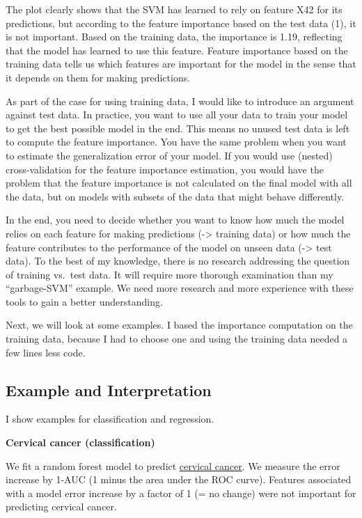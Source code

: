 \documentclass[12pt,]{krantz}
\begin{document}
The plot clearly shows that the SVM has learned to rely on feature X42
for its predictions, but according to the feature importance based on
the test data (1), it is not important. Based on the training data, the
importance is 1.19, reflecting that the model has learned to use this
feature. Feature importance based on the training data tells us which
features are important for the model in the sense that it depends on
them for making predictions.

As part of the case for using training data, I would like to introduce
an argument against test data. In practice, you want to use all your
data to train your model to get the best possible model in the end. This
means no unused test data is left to compute the feature importance. You
have the same problem when you want to estimate the generalization error
of your model. If you would use (nested) cross-validation for the
feature importance estimation, you would have the problem that the
feature importance is not calculated on the final model with all the
data, but on models with subsets of the data that might behave
differently.

In the end, you need to decide whether you want to know how much the
model relies on each feature for making predictions (-\textgreater{}
training data) or how much the feature contributes to the performance of
the model on unseen data (-\textgreater{} test data). To the best of my
knowledge, there is no research addressing the question of training
vs.~test data. It will require more thorough examination than my
``garbage-SVM'' example. We need more research and more experience with
these tools to gain a better understanding.

Next, we will look at some examples. I based the importance computation
on the training data, because I had to choose one and using the training
data needed a few lines less code.

\subsection{Example and
Interpretation}\label{example-and-interpretation}

I show examples for classification and regression.

\textbf{Cervical cancer (classification)}

We fit a random forest model to predict
\protect\hyperlink{cervical}{cervical cancer}. We measure the error
increase by 1-AUC (1 minus the area under the ROC curve). Features
associated with a model error increase by a factor of 1 (= no change)
were not important for predicting cervical cancer.
\end{document}
